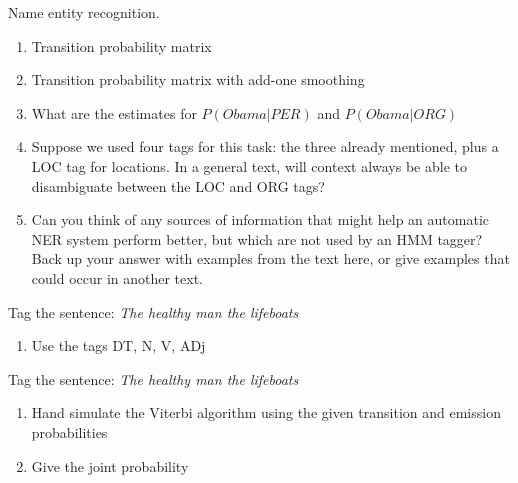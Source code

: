 \documentclass[12pt]{article}
\newcommand{\lp}{\left(}
\newcommand{\rp}{\right)}
\newenvironment{exercise}[2][Exercise]{\begin{trivlist}
\item[\hskip \labelsep {\bfseries #1}\hskip \labelsep {\bfseries #2.}]}{\end{trivlist}}
\begin{document}
\begin{exercise}{3. HMM Tagger} Name entity recognition.
	
\begin{enumerate}[label=(\alph*)]

\item Transition probability matrix \\
		  
\item Transition probability matrix with add-one smoothing \\

\item What are the estimates for $P \lp Obama|PER \rp$ and $P \lp Obama|ORG \rp$ \\

\item Suppose we used four tags for this task: the three already mentioned, plus a LOC tag for locations. In a general text, will context always be able to disambiguate between the LOC and ORG tags? \\

\item Can you think of any sources of information that might help an automatic NER system perform better, but which are not used by an HMM tagger? Back up your answer with examples from the text here, or give examples that could occur in another text. \\

\end{enumerate}
\end{exercise}
 
\begin{exercise}{4. Bigram tagging} Tag the sentence: \textit{The healthy man the lifeboats}
	
\begin{enumerate}[label=(\alph*)]

\item Use the tags DT, N, V, ADj

\end{enumerate}
\end{exercise}
 
\begin{exercise}{5. Viterbi} Tag the sentence: \textit{The healthy man the lifeboats}
	
\begin{enumerate}[label=(\alph*)]

\item Hand simulate the Viterbi algorithm using the given transition and emission probabilities

\item Give the joint probability 

\end{enumerate}
\end{exercise} 
 
 
\end{document}
